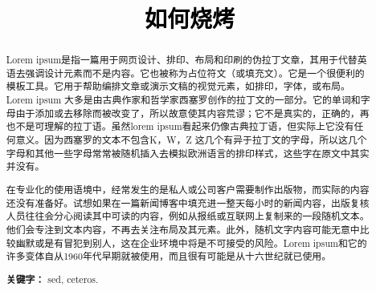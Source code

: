 \documentclass[a4paper,twoside]{article}
\newcommand{\PaperTitle}{如何烧烤}  %
\begin{document}
\newpage

\title{
	\Large{\textcolor{black}{\PaperTitle}}
}
	
	
\maketitle
	
\tableofcontents
 
\newpage
\thispagestyle{empty}

\begin{spacing}{1.2} 

\begin{abstract}
Lorem ipsum是指一篇用于网页设计、排印、布局和印刷的伪拉丁文章，其用于代替英语去强调设计元素而不是内容。它也被称为占位符文（或填充文）。它是一个很便利的模板工具。它用于帮助编排文章或演示文稿的视觉元素，如排印，字体，或布局。Lorem ipsum 大多是由古典作家和哲学家西塞罗创作的拉丁文的一部分。它的单词和字母由于添加或去移除而被改变了，所以故意使其内容荒谬；它不是真实的，正确的，再也不是可理解的拉丁语。虽然lorem ipsum看起来仍像古典拉丁语，但实际上它没有任何意义。因为西塞罗的文本不包含K，W，Z 这几个有异于拉丁文的字母，所以这几个字母和其他一些字母常常被随机插入去模拟欧洲语言的排印样式，这些字在原文中其实并没有。

在专业化的使用语境中，经常发生的是私人或公司客户需要制作出版物，而实际的内容还没有准备好。试想如果在一篇新闻博客中填充进一整天每小时的新闻内容，出版复核人员往往会分心阅读其中可读的内容，例如从报纸或互联网上复制来的一段随机文本。他们会专注到文本内容，不再去关注布局及其元素。此外，随机文字内容可能无意中比较幽默或是有冒犯到别人，这在企业环境中将是不可接受的风险。Lorem ipsum和它的许多变体自从1960年代早期就被使用，而且很有可能是从十六世纪就已使用。

\par\textbf{关键字：} sed, ceteros. 

\end{abstract}

\end{spacing}
\end{document}
